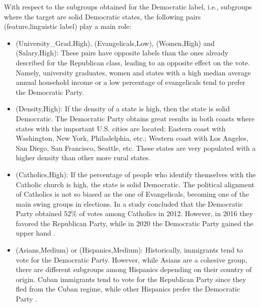  With respect to the subgroups obtained for the Democratic label, i.e., subgroups where the target are solid Democratic states, the following pairs (feature,linguistic label) play a main role:
\begin{itemize}
	\item (University\_Grad,High), (Evangelicals,Low), (Women,High) and (Salary,High): These pairs have opposite labels than the ones already described for the Republican class, leading to an opposite effect on the vote. Namely, university graduates, women and states with a high median average annual household income or a low percentage of evangelicals tend to prefer the Democratic Party.
	\item (Density,High): If the density of a state is high, then the state is solid Democratic. The Democratic Party obtains great results in both coasts where states with the important U.S. cities are located: Eastern coast with Washington, New York, Philadelphia, etc.; Western coast with Los Angeles, San Diego, San Francisco, Seattle, etc. These states are very populated with a higher density than other more rural states.
	\item (Catholics,High): If the percentage of people who identify themselves with the Catholic church is high, the state is solid Democratic. The political alignment of Catholics is not so biased as the one of Evangelicals, becoming one of the main swing groups in elections. In \cite{pewresearchB} a study concluded that the Democratic Party obtained 52\% of votes among Catholics in 2012. However, in 2016 they favored the Republican Party, while in 2020 the Democratic Party gained the upper hand \cite{Newport2020}.
	\item (Asians,Medium) or (Hispanics,Medium): Historically, immigrants tend to vote for the Democratic Party. However, while Asians are a cohesive group, there are different subgroups among Hispanics depending on their country of origin. Cuban immigrants tend to vote for the Republican Party since they fled from the Cuban regime, while other Hispanics prefer the Democratic Party \cite{pewresearchC}.
\end{itemize}

